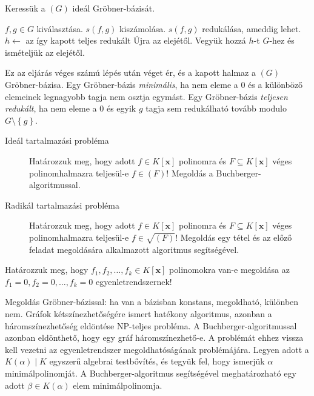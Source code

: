 \documentclass[DIV=15,appendixprefix]{scrreprt}
\theoremstyle{definition}
\theoremstyle{remark}
\begin{document}
Keressük a $ \left( G \right) $ ideál Gröbner-bázisát.
\begin{algorithmic}[1]
	\State $ f,{} g \in G $ kiválasztása.
	\State $ s \left( f,{} g \right) $ kiszámolása.
	\State $ s \left( f,{} g \right) $  redukálása, ameddig lehet.
	\State $ h  \gets$ az így kapott teljes redukált
		\State Újra az elejétől.
	\Else
		\State Vegyük hozzá $ h $-t $ G $-hez és ismételjük az elejétől.
	\EndIf
\end{algorithmic}
Ez az eljárás véges számú lépés után véget ér, és a kapott halmaz a $ \left( G \right) $
Gröbner-bázisa.
Egy Gröbner-bázis \emph{minimális}, ha nem eleme a 0 és a különböző elemeinek legnagyobb tagja nem
osztja egymást. Egy Gröbner-bázis \emph{teljesen redukált}, ha nem eleme a 0 és egyik $ g $ tagja
sem redukálható tovább modulo $ G \setminus \left\{ g \right\}$.
\begin{description}
	\item[Ideál tartalmazási probléma] Határozzuk meg, hogy adott $ f \in K \left[ \mathbf{ x }
		\right] $ polinomra és $ F \subseteq K \left[ \mathbf{ x } \right] $ véges polinomhalmazra
		teljesül-e $ f \in \left( F \right) $! Megoldás a Buchberger-algoritmussal.
	\item[Radikál tartalmazási probléma] Határozzuk meg, hogy adott $ f \in  K \left[ \mathbf{ x }
		\right]$ polinomra és $ F \subseteq K \left[ \mathbf{ x } \right] $ véges polinomhalmazra
		teljesül-e $ f \in \sqrt{ \left( F \right) }$! Megoldás egy tétel és az előző feladat
		megoldására alkalmazott algoritmus segítségével.
\end{description}
%
Határozzuk meg, hogy $ f_{ 1 },{} f_{ 2 },{} \ldots,{} f_{ k } \in K \left[ \mathbf{ x } \right] $
polinomokra van-e megoldása az $ f_{ 1 } = 0,{} f_{ 2 } = 0,{} \ldots,{} f_{ k } = 0 $
egyenletrendszernek!

Megoldás Gröbner-bázissal: ha van a bázisban konstans, megoldható, különben nem.
%
Gráfok kétszínezhetőségére ismert hatékony algoritmus, azonban a háromszínezhetőség eldöntése
NP-teljes probléma. A Buchberger-algoritmussal azonban eldönthető, hogy egy gráf háromszínezhető-e.
A problémát ehhez vissza kell vezetni az egyenletrendszer megoldhatóságának problémájára.
%
Legyen adott a $ K \left( \alpha \right) \mid K $ egyszerű algebrai testbővítés, és tegyük fel, hogy
ismerjük $ \alpha $ minimálpolinomját. A Buchberger-algoritmus segítségével meghatározható egy adott
$\beta \in K \left( \alpha \right) $ elem minimálpolinomja.
%
\end{document}
